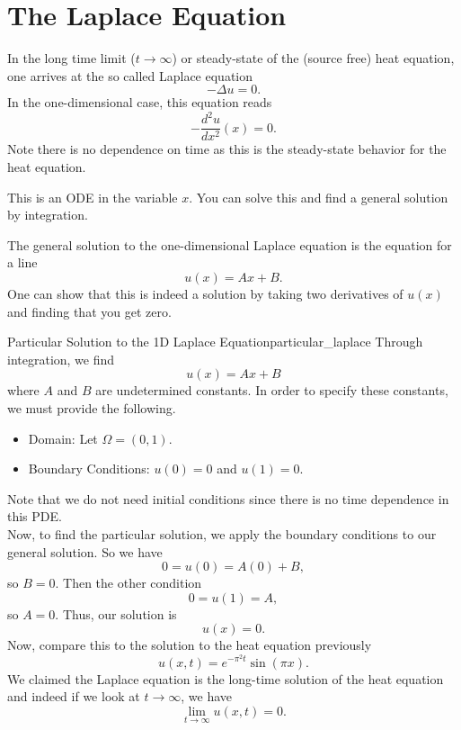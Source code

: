     
        \section{The Laplace Equation}
        In the long time limit ($t\to \infty$) or steady-state of the (source free) heat equation, one arrives at the so called Laplace equation
        \[
        -\Delta u = 0.
        \]
        In the one-dimensional case, this equation reads
        \[
        -\frac{d^2 u}{dx^2}(x) = 0.
        \]
        Note there is no dependence on time as this is the steady-state behavior for the heat equation.
        
        \begin{exercise}
        This is an ODE in the variable $x$.  You can solve this and find a general solution by integration.  
        \end{exercise} 
        
        \begin{answer}
        The general solution to the one-dimensional Laplace equation is the equation for a line
        \[
        u(x) = Ax+B.
        \]
        One can show that this is indeed a solution by taking two derivatives of $u(x)$ and finding that you get zero.
        \end{answer}
        
        \begin{ex}{Particular Solution to the 1D Laplace Equation}{particular_laplace}
        Through integration, we find
        \[
        u(x) = Ax+B
        \]
        where $A$ and $B$ are undetermined constants.  In order to specify these constants, we must provide the following.
        \begin{itemize}
            \item Domain: Let $\Omega = (0,1)$.
            \item Boundary Conditions: $u(0)=0$ and $u(1)=0$.  
        \end{itemize}
        Note that we do not need initial conditions since there is no time dependence in this PDE.\\
        
        Now, to find the particular solution, we apply the boundary conditions to our general solution.  So we have
        \[
        0=u(0)=A(0)+B,
        \]
        so $B=0$.  Then the other condition 
        \[
        0=u(1)=A,
        \]
        so $A=0$.  Thus, our solution is
        \[
        \boxed{u(x)=0}.
        \]
        Now, compare this to the solution to the heat equation previously
        \[
        u(x,t)=e^{-\pi^2 t}\sin(\pi x).
        \]
        We claimed the Laplace equation is the long-time solution of the heat equation and indeed if we look at $t\to\infty$, we have
        \[
        \lim_{t\to \infty} u(x,t)=0.
        \]
        \end{ex}
        

